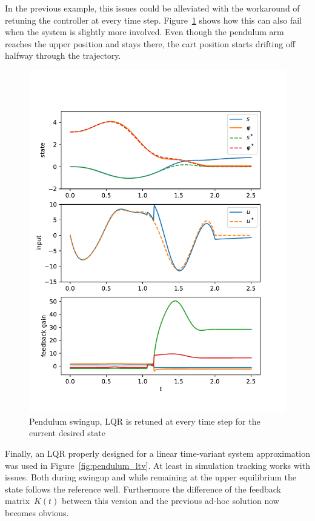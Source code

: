 \documentclass[a4paper,11pt,headinclude=true,headsepline,parskip=half,DIV=13]{scrartcl}
\begin{document}
In the previous example, this issues could be alleviated with the workaround of retuning the controller at every time step.
Figure~\ref{fig:pendulum_pseudoltv} shows how this can also fail when the system is slightly more involved.
Even though the pendulum arm reaches the upper position and stays there, the cart position starts drifting off halfway through the trajectory.

\begin{figure}[ht]
    \centering
    \includegraphics[scale=1]{img/pendulum_pseudoltv.pdf}
    \caption{Pendulum swingup, LQR is retuned at every time step for the current desired state}
    \label{fig:pendulum_pseudoltv}
\end{figure}

Finally, an LQR properly designed for a linear time-variant system approximation was used in Figure~\ref{fig:pendulum_ltv}.
At least in simulation tracking works with issues.
Both during swingup and while remaining at the upper equilibrium the state follows the reference well.
Furthermore the difference of the feedback matrix~$K(t)$ between this version and the previous ad-hoc solution now becomes obvious.
\end{document}
